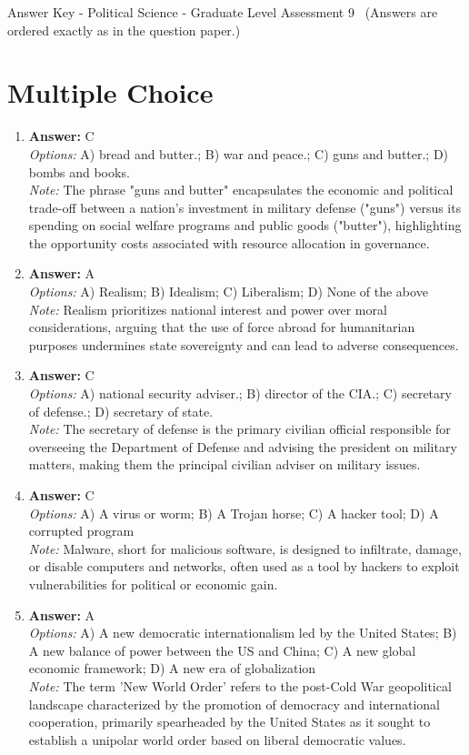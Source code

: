 \documentclass[12pt]{article}
\begin{document}
\begin{center}
Answer Key - Political Science - Graduate Level Assessment 9 \
\small (Answers are ordered exactly as in the question paper.)
\end{center}

\section*{Multiple Choice}
\begin{enumerate}[label=\arabic*.]
\item \textbf{Answer:} C
\\ \textit{Options:} A) bread and butter.; B) war and peace.; C) guns and butter.; D) bombs and books.
\\ \textit{Note:} The phrase "guns and butter" encapsulates the economic and political trade-off between a nation's investment in military defense ("guns") versus its spending on social welfare programs and public goods ("butter"), highlighting the opportunity costs associated with resource allocation in governance.
\item \textbf{Answer:} A
\\ \textit{Options:} A) Realism; B) Idealism; C) Liberalism; D) None of the above
\\ \textit{Note:} Realism prioritizes national interest and power over moral considerations, arguing that the use of force abroad for humanitarian purposes undermines state sovereignty and can lead to adverse consequences.
\item \textbf{Answer:} C
\\ \textit{Options:} A) national security adviser.; B) director of the CIA.; C) secretary of defense.; D) secretary of state.
\\ \textit{Note:} The secretary of defense is the primary civilian official responsible for overseeing the Department of Defense and advising the president on military matters, making them the principal civilian adviser on military issues.
\item \textbf{Answer:} C
\\ \textit{Options:} A) A virus or worm; B) A Trojan horse; C) A hacker tool; D) A corrupted program
\\ \textit{Note:} Malware, short for malicious software, is designed to infiltrate, damage, or disable computers and networks, often used as a tool by hackers to exploit vulnerabilities for political or economic gain.
\item \textbf{Answer:} A
\\ \textit{Options:} A) A new democratic internationalism led by the United States; B) A new balance of power between the US and China; C) A new global economic framework; D) A new era of globalization
\\ \textit{Note:} The term 'New World Order' refers to the post-Cold War geopolitical landscape characterized by the promotion of democracy and international cooperation, primarily spearheaded by the United States as it sought to establish a unipolar world order based on liberal democratic values.
\end{enumerate}
\end{document}
